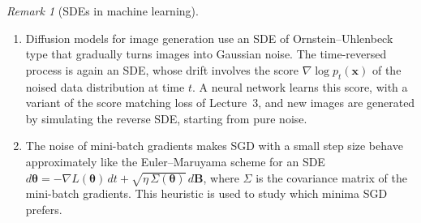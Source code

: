 \documentclass[11pt]{article}
\theoremstyle{definition}
\theoremstyle{plain}
\theoremstyle{remark}
\newtheorem{remark}[definition]{Remark}
\begin{document}
\begin{remark}[SDEs in machine learning]
    \begin{enumerate}
        \item Diffusion models for image generation use an SDE of Ornstein--Uhlenbeck type that gradually turns images into Gaussian noise. The time-reversed process is again an SDE, whose drift involves the score $\nabla\log p_t(\mathbf{x})$ of the noised data distribution at time $t$. A neural network learns this score, with a variant of the score matching loss of Lecture~3, and new images are generated by simulating the reverse SDE, starting from pure noise.
        \item The noise of mini-batch gradients makes SGD with a small step size behave approximately like the Euler--Maruyama scheme for an SDE $d\boldsymbol{\theta} = -\nabla L(\boldsymbol{\theta})\,dt + \sqrt{\eta\,\Sigma(\boldsymbol{\theta})}\,d\mathbf{B}$, where $\Sigma$ is the covariance matrix of the mini-batch gradients. This heuristic is used to study which minima SGD prefers.
    \end{enumerate}
\end{remark}
\end{document}
